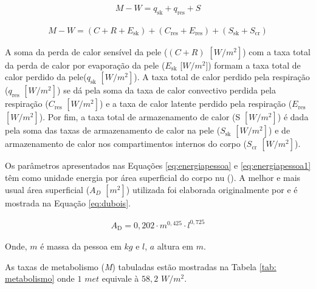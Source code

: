 \documentclass[acronym,symbols,table]{fei}
\begin{document}
\begin{equation} \label{eq:energiapessoa}
    \begin{aligned}
    M - W = q_{\text{sk}} + q_{\text{res}} + S
    \end{aligned}
\end{equation}

\begin{equation} \label{eq:energiapessoa1}
    \begin{aligned}
    M - W = (C + R+ E_{\text{sk}}) + (C_{\text{res}} + E_{\text{res}}) + (S_{\text{sk}} + S_{\text{cr}})
    \end{aligned}
\end{equation}

A soma da perda de calor sensível da pele ($(C + R)$ $[W/m^{2}]$) com a taxa total da perda de calor por evaporação da pele ($E_{\text{sk}}$ [$W/m^{2}$]) formam a taxa total de calor perdido da pele($q_{\text{sk}}$ $[W/m^{2}]$). A taxa total de calor perdido pela respiração ($q_{\text{res}}$ $[W/m^{2}]$) se dá pela soma da taxa de calor convectivo perdida pela respiração ($C_{\text{res}}$ $[W/m^{2}]$) e a taxa de calor latente perdido pela respiração ($E_{\text{res}}$ $[W/m^{2}]$). Por fim, a taxa total de armazenamento de calor (S $[W/m^{2}]$) é dada pela soma das taxas de armazenamento de calor na pele ($S_{\text{sk}}$ $[W/m^{2}]$) e de armazenamento de calor nos compartimentos internos do corpo ($S_{\text{cr}}$ $[W/m^{2}]$).


Os parâmetros apresentados nas Equações \ref{eq:energiapessoa} e \ref{eq:energiapessoa1} têm como unidade energia por área superficial do corpo nu (\textcite{ASHRAE2009}). A melhor e mais usual área superficial ($A_{D}$ $[m^{2}]$) utilizada foi elaborada originalmente por \textcite{dubois1916formula} e é mostrada na Equação \ref{eq:dubois}.

\begin{equation} \label{eq:dubois}
    \begin{aligned}
   A_{\text{D}} = 0,202 \cdot m^{0,425} \cdot l^{0,725}
    \end{aligned}
\end{equation}

Onde, $m$ é massa da pessoa em $kg$ e $l$, $a$ altura em $m$. 

As taxas de metabolismo (\textit{M}) tabuladas estão mostradas na Tabela \ref{tab: metabolismo} onde $1$ $met$ equivale à $58,2$ $W/m^2$.
\end{document}
